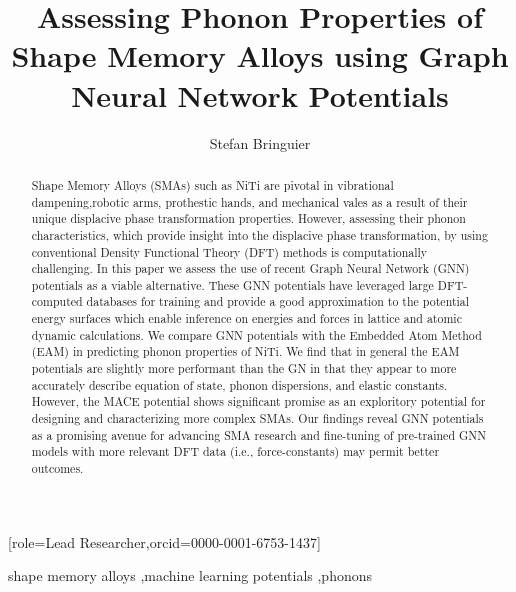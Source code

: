 \documentclass[preprint]{elsarticle}
\begin{document}
\title{Assessing Phonon Properties of Shape Memory Alloys using Graph Neural Network Potentials}

\author[1]{Stefan Bringuier}[role=Lead Researcher,orcid=0000-0001-6753-1437]

\begin{abstract}
Shape Memory Alloys (SMAs) such as NiTi are pivotal in vibrational dampening,robotic arms, prothestic hands, and mechanical vales as a result of their unique displacive phase transformation properties. However, assessing their phonon characteristics, which provide insight into the displacive phase transformation, by using conventional Density Functional Theory (DFT) methods is computationally challenging. In this paper we assess the use of recent Graph Neural Network (GNN) potentials as a viable alternative. These GNN potentials have leveraged large DFT-computed databases for training and provide a good approximation to the potential energy surfaces which enable inference on energies and forces in lattice and atomic dynamic calculations. We compare GNN potentials with the Embedded Atom Method (EAM) in predicting phonon properties of NiTi. We find that in general the EAM potentials are slightly more performant than the GN in that they appear to more accurately describe equation of state, phonon dispersions, and elastic constants. However, the MACE potential shows significant promise as an exploritory potential for designing and characterizing more complex SMAs. Our findings reveal GNN potentials as a promising avenue for advancing SMA research and fine-tuning of pre-trained GNN models with more relevant DFT data (i.e., force-constants) may permit better outcomes.  
\end{abstract}

\begin{keyword}
  shape memory alloys \sep machine learning potentials \sep phonons
\end{keyword}


\maketitle

\end{document}
